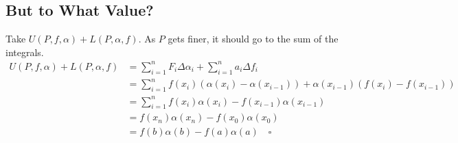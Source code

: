 \documentclass[12pt]{article}
\begin{document}
\subsection{But to What Value?}

Take $U(P, f, \alpha) + L(P, \alpha, f)$.
As $P$ gets finer, it should go to the sum of the integrals.
\begin{align*}
  U(P, f, \alpha) + L(P, \alpha, f)
   & = \sum_{i=1}^{n} F_i \Delta \alpha_i + \sum_{i=1}^{n} a_i \Delta f_i                    \\
   & = \sum_{i=1}^{n} f(x_i)(\alpha(x_i)-\alpha(x_{i-1}))+\alpha(x_{i-1})(f(x_i)-f(x_{i-1})) \\
   & = \sum_{i=1}^{n} f(x_i)\alpha(x_i) - f(x_{i-1})\alpha(x_{i-1})                          \\
   & = f(x_n)\alpha(x_n) - f(x_0)\alpha(x_0)                                                 \\
   & = f(b)\alpha(b)-f(a)\alpha(a)\quad\square
\end{align*}
\end{document}
